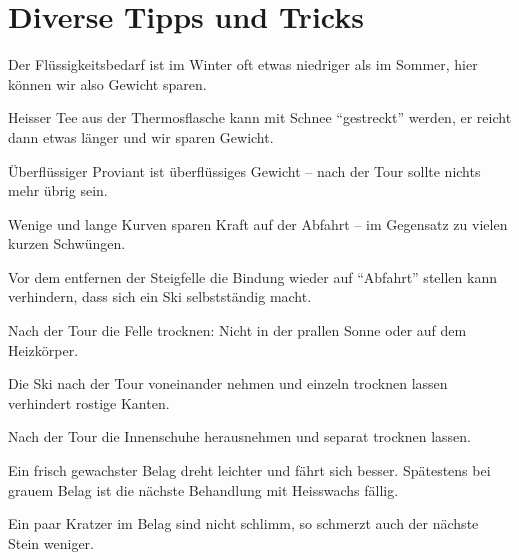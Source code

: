\section{Diverse Tipps und Tricks}

Der Flüssigkeitsbedarf ist im Winter oft etwas niedriger als im Sommer, hier können wir also Gewicht sparen.

Heisser Tee aus der Thermosflasche kann mit Schnee \enquote{gestreckt} werden, er reicht dann etwas länger und wir sparen Gewicht.

Überflüssiger Proviant ist überflüssiges Gewicht -- nach der Tour sollte nichts mehr übrig sein.

Wenige und lange Kurven sparen Kraft auf der Abfahrt -- im Gegensatz zu vielen kurzen Schwüngen.

Vor dem entfernen der Steigfelle die Bindung wieder auf \enquote{Abfahrt} stellen kann verhindern, dass sich ein Ski selbstständig macht.

Nach der Tour die Felle trocknen: Nicht in der prallen Sonne oder auf dem Heizkörper.

Die Ski nach der Tour voneinander nehmen und einzeln trocknen lassen verhindert rostige Kanten.

Nach der Tour die Innenschuhe herausnehmen und separat trocknen lassen.

Ein frisch gewachster Belag dreht leichter und fährt sich besser.
Spätestens bei grauem Belag ist die nächste Behandlung mit Heisswachs fällig.

Ein paar Kratzer im Belag sind nicht schlimm, so schmerzt auch der nächste Stein weniger.
